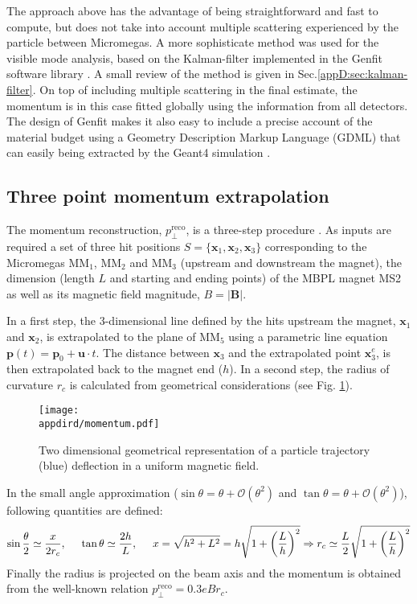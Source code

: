 The approach above has the advantage of being straightforward and fast to compute, but does not take into account multiple scattering experienced by the particle between Micromegas. A more sophisticate method was used for the visible mode analysis, based on the Kalman-filter implemented in the Genfit software library \cite{genfit}. A small review of the method is given in Sec.\ref{appD:sec:kalman-filter}. On top of including multiple scattering in the final estimate, the momentum is in this case fitted globally using the information from all detectors. The design of Genfit makes it also easy to include a precise account of the material budget using a Geometry Description Markup Language (GDML) that can easily being extracted by the Geant4 simulation \cite{gdml}.

\subsection{Three point momentum extrapolation}
\label{appD:sec:mom-reco-simple}

The momentum reconstruction, $p_\perp^\text{reco}$, is a three-step procedure \cite{na64-muon-note}. As inputs are required a set of three hit positions $S=\{\mathbf{x}_1,\mathbf{x}_2,\mathbf{x}_3\}$ corresponding to the Micromegas MM$_1$, MM$_2$ and MM$_3$ (upstream and downstream the magnet), the dimension (length $L$ and starting and ending points) of the MBPL magnet MS2 as well as its magnetic field magnitude, $B=|\mathbf{B}|$.

In a first step, the 3-dimensional line defined by the hits upstream the magnet, $\mathbf{x}_1$ and $\mathbf{x}_2$, is extrapolated to the plane of MM$_5$ using a parametric line equation $\mathbf{p}(t)=\mathbf{p}_0+\mathbf{u}\cdot t$. The distance between $\mathbf{x}_3$ and the extrapolated point $\mathbf{x}_3^{e}$, is then extrapolated back to the magnet end ($h$). In a second step, the radius of curvature $r_c$ is calculated from geometrical considerations (see Fig. \ref{fig:momentumgeo}).
\begin{figure}[tbh!]
    \centering
    \texttt{[image: \\appdird/momentum.pdf]}
    \caption{Two dimensional geometrical representation of a particle trajectory (blue) deflection in a uniform magnetic field.}
    \label{fig:momentumgeo}
\end{figure}
In the small angle approximation ($\sin\theta=\theta+\mathcal{O}(\theta^2)$ and $\tan\theta=\theta+\mathcal{O}(\theta^2)$), following quantities are defined:
\begin{equation}
  \label{eq:mom-simple}
        \sin\frac{\theta}{2}\simeq\frac{x}{2r_c},\hspace{5mm}
        \tan\theta\simeq\frac{2h}{L},\hspace{5mm}x=\sqrt{h^2+L^2}=h\sqrt{1+\left(\frac{L}{h}\right)^2}\Rightarrow r_c\simeq\frac{L}{2}\sqrt{1+\left(\frac{L}{h}\right)^2}
\end{equation}
Finally the radius is projected on the beam axis and the momentum is obtained from the well-known relation $p_\perp^\text{reco}=0.3eBr_c$. 

